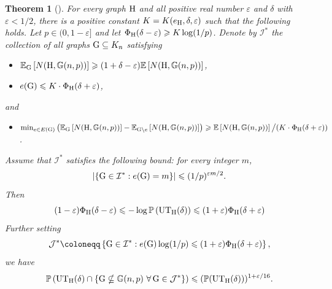 \documentclass[a4paper,11pt,english,reqno]{amsart}
\numberwithin{equation}{section}
\renewcommand{\leq}{\leqslant}
\renewcommand{\geq}{\geqslant}
\newcommand{\I}{\mathcal{I}}
\newcommand{\E}{\mathbb{E}}
\newcommand{\UTH}{\textup{UT}_{\textup{H}}(\delta)}
\newcommand{\uH}{\textup{H}}
\renewcommand{\P}{\mathbb{P}}
\newcommand{\G}{\mathbb{G}}
\newcommand{\tu}[1]{\textup{#1}}
\newtheorem{theorem}{Theorem}[section]
\newcommand{\cyan}[1]{{\color{cyan} #1}}
\begin{document}
	\begin{theorem}[{\cite[Theorem~3.1]{HMS}}]
		\label{HMS:technical result}
		For every graph $\uH$ and all positive real number $\varepsilon$ and $\delta$ with $\varepsilon<1/2$, there is a positive constant $K=K(e_{\uH}, \delta, \varepsilon)$ such that the following holds. Let $p\in (0,1-\varepsilon]$ and let $\Phi_{\uH}(\delta-\varepsilon)\geq K\log(1/p)$.
		Denote by $\I^{*}$ the collection of all graphs $\textup{G}\subseteq K_n$ %
		satisfying 
		\begin{itemize}
			\item[(C1)] $\E_{\textup{G}}\left[N(\uH, \G(n,p))\right]\geq (1+\delta-\varepsilon)\E\left[N(\uH,\G(n,p) )\right]$,
			\item[(C2)] $e(\textup{G})\leq K\cdot \Phi_{\uH}(\delta+\varepsilon)$, 
			
		\end{itemize}
		and 
		\begin{itemize}
			\item[(C3)]$\min_{e\in E(\textup{G})}\left(\mathbb{E}_{\textup{G}}\left[N(\uH, \G(n,p))\right]- \mathbb{E}_{\textup{G}\setminus e}\left[N(\uH,\G(n,p))\right]\right) \geq\mathbb{E}\left[N(\uH, \G(n,p))\right]\big/(K\cdot \Phi_{\uH}(\delta +\varepsilon))$.
		\end{itemize}
		Assume that $\I^{*}$ satisfies the following bound: for every integer $m$, 
		\begin{equation}
			\label{eq:entropic stability HMS}
			|\{\textup{G}\in \I^{*}: e(\textup{G})=m\}|\leq (1/p)^{\varepsilon m/2}.
		\end{equation}
		Then
		\begin{equation}
			\label{eq:tight with variational problem}
			(1-\varepsilon)\Phi_{\uH}(\delta-\varepsilon)\leq -\log\P\left(\UTH\right)\leq (1+\varepsilon)\Phi_{\uH}(\delta+\varepsilon)
		\end{equation}
		Further setting
		\[
		\mathcal{J}^{*}\coloneqq \left\{ \tu{G} \in \mathcal{I}^*: e(\tu{G})\log(1/p)\leq (1+\varepsilon)\Phi_{\uH}(\delta+\varepsilon) \right\},
		\]
		we have		
			\begin{equation}
				\label{cond_struc:step 1}
				\P\left(\UTH \cap \left\{\tu{G}\nsubseteq \G(n,p)\ \forall \, \tu{G}\in \mathcal{J}^{*}\right\}\right) \leq (\P(\UTH))^{1+\varepsilon/16}.
			\end{equation}
		\end{theorem}
		
\end{document}
